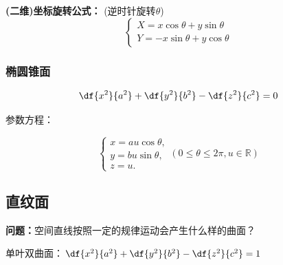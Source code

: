 \begin{center}
\end{center}

{\bf (二维)坐标旋转公式：}{ (逆时针旋转$\theta$)}
$${\left\{\begin{array}{l}
	X=x\cos\theta+y\sin\theta\\
	Y=-x\sin\theta+y\cos\theta
\end{array}\right.}$$

\subsubsection{椭圆锥面}

$${\df{x^2}{a^2}+\df{y^2}{b^2}-\df{z^2}{c^2}=0}$$

参数方程：

$$\left\{\begin{array}{l}
	x=au\cos\theta,\\
	y=bu\sin\theta,\\
	z=u.
\end{array}\right.(0\leq\theta\leq 2\pi,u\in\mathbb{R})$$

\subsection{直纹面}

{\bf 问题：}空间直线按照一定的规律运动会产生什么样的曲面？

\begin{center}
	
	单叶双曲面：$\df{x^2}{a^2}+\df{y^2}{b^2}-\df{z^2}{c^2}=1$
\end{center}

